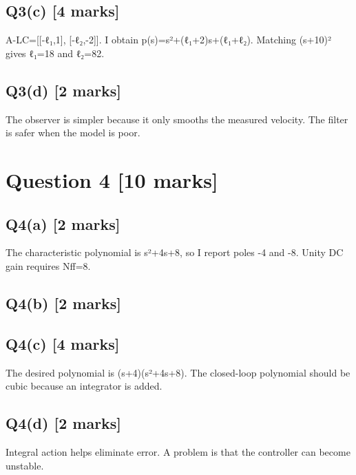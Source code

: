 \documentclass[11pt,a4paper]{article}
\begin{document}
\subsection*{Q3(c) \hfill [4 marks]}

A-LC=[[-ℓ₁,1], [-ℓ₂,-2]].
I obtain p(s)=s²+(ℓ₁+2)s+(ℓ₁+ℓ₂).
Matching (s+10)² gives ℓ₁=18 and ℓ₂=82.

\subsection*{Q3(d) \hfill [2 marks]}

The observer is simpler because it only smooths the measured velocity.
The filter is safer when the model is poor.

\section*{Question 4 \hfill [10 marks]}
\subsection*{Q4(a) \hfill [2 marks]}

The characteristic polynomial is s²+4s+8, so I report poles -4 and -8.
Unity DC gain requires Nff=8.

\subsection*{Q4(b) \hfill [2 marks]}

\vspace{2mm}

\subsection*{Q4(c) \hfill [4 marks]}

The desired polynomial is (s+4)(s²+4s+8).
The closed-loop polynomial should be cubic because an integrator is added.

\subsection*{Q4(d) \hfill [2 marks]}

Integral action helps eliminate error.
A problem is that the controller can become unstable.
\end{document}
